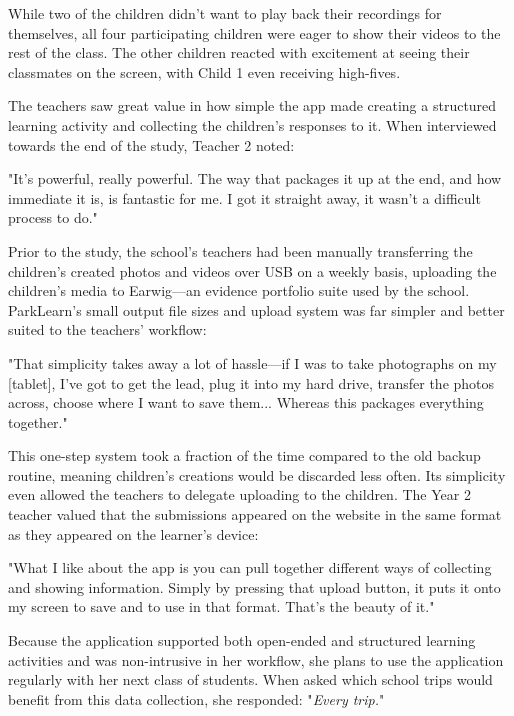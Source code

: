 While two of the children didn’t want to play back their recordings for themselves, all four participating children were eager to show their videos to the rest of the class. The other children reacted with excitement at seeing their classmates on the screen, with Child 1 even receiving high-fives. 

The teachers saw great value in how simple the app made creating a structured learning activity and collecting the children’s responses to it. When interviewed towards the end of the study, Teacher 2 noted:

\begin{displayquote}
"It’s powerful, really powerful. The way that packages it up at the end, and how immediate it is, is fantastic for me. I got it straight away, it wasn't a difficult process to do."
\end{displayquote}

Prior to the study, the school’s teachers had been manually transferring the children’s created photos and videos over USB on a weekly basis, uploading the children’s media to Earwig—an evidence portfolio suite used by the school. ParkLearn’s small output file sizes and upload system was far simpler and better suited to the teachers’ workflow:

\begin{displayquote}
"That simplicity takes away a lot of hassle—if I was to take photographs on my [tablet], I've got to get the lead, plug it into my hard drive, transfer the photos across, choose where I want to save them... Whereas this packages everything together."
\end{displayquote}

This one-step system took a fraction of the time compared to the old backup routine, meaning children’s creations would be discarded less often. Its simplicity even allowed the teachers to delegate uploading to the children. The Year 2 teacher valued that the submissions appeared on the website in the same format as they appeared on the learner’s device: 

\begin{displayquote}
"What I like about the app is you can pull together different ways of collecting and showing information. Simply by pressing that upload button, it puts it onto my screen to save and to use in that format. That’s the beauty of it."
\end{displayquote}


Because the application supported both open-ended and structured learning activities and was non-intrusive in her workflow, she plans to use the application regularly with her next class of students. When asked which school trips would benefit from this data collection, she responded: "\textit{Every trip.}"

